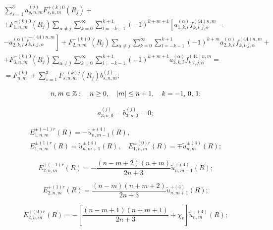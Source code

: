 \begin{russian}
\begin{multline}
\sum\limits_{s = 1}^3 {a_{s,n,m}^{(j)}} F_{s,n,m}^{ + (k)0}({R_j}) + \\
+ F_{1,n,m}^{ - (k)0}({R_j})\sum\limits_{\alpha  \ne j} {\sum\limits_{k = 0}^\infty  {\sum\limits_{l =  - k - 1}^{k + 1} {{{( - 1)}^{k + m + 1}}} } \left[ {a_{1,k,l}^{(\alpha )}f_{k,l,j,\alpha }^{(44)n,m} - } \right.} \\
\left. { - a_{2,k,l}^{(\alpha )}\tilde f_{k,l,j,\alpha }^{ - (44)n,m}} \right] + F_{2,n,m}^{ - (k)0}({R_j})\sum\limits_{\alpha  \ne j} {\sum\limits_{k = 0}^\infty  {\sum\limits_{l =  - k - 1}^{k + 1} {{{( - 1)}^{k + m}}} } a_{2,k,l}^{(\alpha )}f_{k,l,j,\alpha }^{(44)n,m} + } \\
+ F_{3,n,m}^{ - (k)0}({R_j})\sum\limits_{\alpha  \ne j} \sum\limits_{k = 0}^\infty  {\sum\limits_{l =  - k - 1}^{k + 1} {{{( - 1)}^{k + m + 1}}} } a_{3,k,l}^{(\alpha )}f_{k,l,j,\alpha }^{(44)n,m} = \\
= F_{n,m}^{(k)} + \sum\limits_{s = 1}^3 {F_{s,n,m}^{ - (k)j}} ({R_j})b_{s,n,m}^{(j)};
\end{multline}

\begin{equation}
n,m \in\mathbb{Z} :\quad n \ge 0,\quad |m| \le n + 1,\quad k =  - 1,{\mkern 1mu} {\kern 1pt} 0,{\mkern 1mu} {\kern 1pt} 1;
\end{equation}

\begin{equation}
a_{3,n,0}^{(j)} = b_{3,n,0}^{(j)} = 0;
\end{equation}

\begin{multline}
E_{1,n,m}^{ \pm ( - 1)r}(R) =  - \tilde u_{n,m - 1}^{ \pm (4)}(R), \\
E_{1,n,m}^{ \pm (1)r}(R) = \tilde u_{n,m + 1}^{ \pm (4)}(R), \quad 
E_{1,n,m}^{ \pm (0)r}(R) =  \mp \tilde u_{n,m}^{ \pm (4)}(R);
\end{multline}

\begin{equation}
E_{2,n,m}^{ + ( - 1)r}(R) =  - \frac{{(n - m + 2)(n + m)}}{{2n + 3}}\tilde u_{n,m - 1}^{ + (4)}(R);
\end{equation}

\begin{equation}
E_{2,n,m}^{ + (1)r}(R) = \frac{{(n - m)(n + m + 2)}}{{2n + 3}}\tilde u_{n,m + 1}^{ + (4)}(R);
\end{equation}

\begin{equation}
E_{2,n,m}^{ + (0)r}(R) =  - \left[ {\frac{{(n - m + 1)(n + m + 1)}}{{2n + 3}} + {\chi _r}} \right]\tilde u_{n,m}^{ + (4)}(R);
\end{equation}


\end{russian}

